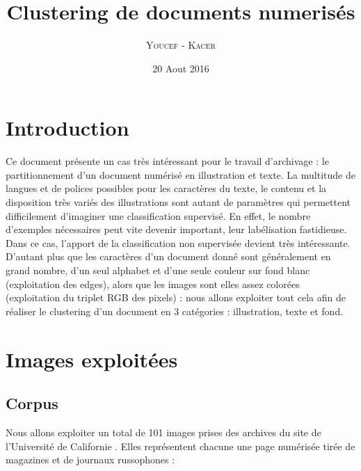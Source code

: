 \documentclass{book}
\title{Clustering de documents numerisés}
\author{\textsc{Youcef} - \textsc{Kacer}}
\date{20 Aout 2016}
\begin{document}
 
\maketitle

\tableofcontents

\frontmatter
\chapter{Introduction}
Ce document présente un cas très intéressant pour le travail d'archivage : le partitionnement d'un document numérisé en illustration et texte.
La multitude de langues et de polices possibles pour les caractères du texte, le contenu et la disposition très variés des illustrations sont 
autant de paramètres qui permettent difficilement d'imaginer une classification supervisé. En effet, le nombre d'exemples nécessaires peut vite devenir important,
leur labélisation fastidieuse.\\
Dans ce cas, l'apport de la classification non supervisée devient très intéressante. D'autant plus que les caractères d'un document donné sont généralement en grand 
nombre, d'un seul alphabet et d'une seule couleur sur fond blanc (exploitation des edges), alors que les images sont elles assez colorées (exploitation du triplet 
RGB des pixels) : nous allons exploiter tout cela afin de réaliser le clustering d'un document en 3 catégories : illustration, texte et fond.


\mainmatter
\chapter{Images exploitées}
\section{Corpus}\label{labelisation}
Nous allons exploiter un total de 101 images prises des archives du site de l'Université de Californie \cite{uci}. 
Elles représentent chacune une page numérisée tirée de magazines et de journaux russophones \cite{dataset} :
\end{document}
